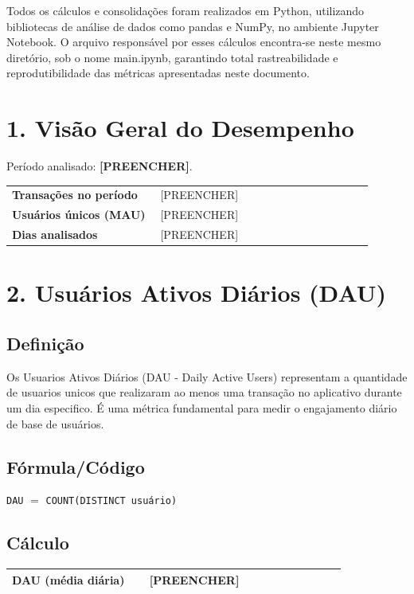 \documentclass[12pt]{article}
\providecommand{\Periodo}{[PREENCHER]}
\providecommand{\TransacoesPeriodo}{[PREENCHER]}
\providecommand{\UsuariosUnicos}{[PREENCHER]}
\providecommand{\DiasAnalisados}{[PREENCHER]}
\providecommand{\DAUmedio}{[PREENCHER]}
\begin{document}
Todos os cálculos e consolidações foram realizados em Python, utilizando bibliotecas de análise de dados como pandas e NumPy, no ambiente Jupyter Notebook.
O arquivo responsável por esses cálculos encontra-se neste mesmo diretório, sob o nome main.ipynb, garantindo total rastreabilidade e reprodutibilidade das métricas apresentadas neste documento.
\section*{1. Visão Geral do Desempenho}
Período analisado: \textbf{\Periodo}.

\begin{center}
\begin{tabular}{>{\bfseries}p{0.37\linewidth} p{0.53\linewidth}}
\toprule
Transações no período & \TransacoesPeriodo \\
Usuários únicos (MAU) & \UsuariosUnicos \\
Dias analisados & \DiasAnalisados \\
\bottomrule
\end{tabular}
\end{center}

\section*{2. Usuários Ativos Diários (DAU)}
\subsection*{Definição}
Os Usuarios Ativos Diários (DAU - Daily Active Users) representam a quantidade de usuarios unicos que realizaram ao menos uma transação no aplicativo durante um dia especifico. É uma métrica fundamental para medir o engajamento diário de base de usuários.

\subsection*{Fórmula/Código}
\noindent \texttt{DAU} $=$ \texttt{COUNT(DISTINCT usuário)}

\subsection*{Cálculo}
\begin{center}
\begin{tabular}{>{\bfseries}p{0.37\linewidth} p{0.53\linewidth}}
\toprule
DAU (média diária) & \DAUmedio \\
\bottomrule
\end{tabular}
\end{center}
\end{document}
